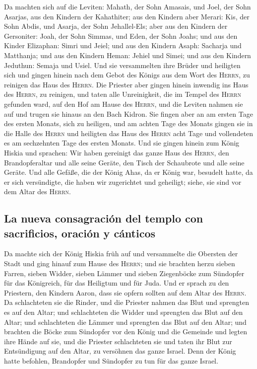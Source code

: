  Da machten sich auf die Leviten: Mahath, der Sohn
Amasais, und Joel, der Sohn Asarjas, aus den Kindern der Kahathiter; aus
den Kindern aber Merari: Kis, der Sohn Abdis, und Asarja, der Sohn
Jehallel-Els; aber aus den Kindern der Gersoniter: Joah, der Sohn
Simmas, und Eden, der Sohn Joahs;  und aus den Kinder
Elizaphan: Simri und Jeiel; und aus den Kindern Asaph: Sacharja und
Matthanja;  und aus den Kindern Heman: Jehiel und Simei;
und aus den Kindern Jeduthun: Semaja und Usiel.  Und sie
versammelten ihre Brüder und heiligten sich und gingen hinein nach dem
Gebot des Königs aus dem Wort des \textsc{Herrn}, zu reinigen das Haus
des \textsc{Herrn}.  Die Priester aber gingen hinein
inwendig ins Haus des \textsc{Herrn}, zu reinigen, und taten alle
Unreinigkeit, die im Tempel des \textsc{Herrn} gefunden ward, auf den
Hof am Hause des \textsc{Herrn}, und die Leviten nahmen sie auf und
trugen sie hinaus an den Bach Kidron.  Sie fingen aber an
am ersten Tage des ersten Monats, sich zu heiligen, und am achten Tage
des Monats gingen sie in die Halle des \textsc{Herrn} und heiligten das
Haus des \textsc{Herrn} acht Tage und vollendeten es am sechzehnten Tage
des ersten Monats.  Und sie gingen hinein zum König
Hiskia und sprachen: Wir haben gereinigt das ganze Haus des
\textsc{Herrn}, den Brandopferaltar und alle seine Geräte, den Tisch der
Schaubrote und alle seine Geräte.  Und alle Gefäße, die
der König Ahas, da er König war, besudelt hatte, da er sich versündigte,
die haben wir zugerichtet und geheiligt; siehe, sie sind vor dem Altar
des \textsc{Herrn}.

\hypertarget{la-nueva-consagraciuxf3n-del-templo-con-sacrificios-oraciuxf3n-y-cuxe1nticos}{%
\subsection{La nueva consagración del templo con sacrificios, oración y
cánticos}\label{la-nueva-consagraciuxf3n-del-templo-con-sacrificios-oraciuxf3n-y-cuxe1nticos}}

 Da machte sich der König Hiskia früh auf und versammelte
die Obersten der Stadt und ging hinauf zum Hause des \textsc{Herrn};
 und sie brachten herzu sieben Farren, sieben Widder,
sieben Lämmer und sieben Ziegenböcke zum Sündopfer für das Königreich,
für das Heiligtum und für Juda. Und er sprach zu den Priestern, den
Kindern Aaron, dass sie opfern sollten auf dem Altar des \textsc{Herrn}.
 Da schlachteten sie die Rinder, und die Priester nahmen
das Blut und sprengten es auf den Altar; und schlachteten die Widder und
sprengten das Blut auf den Altar; und schlachteten die Lämmer und
sprengten das Blut auf den Altar;  und brachten die Böcke
zum Sündopfer vor den König und die Gemeinde und legten ihre Hände auf
sie,  und die Priester schlachteten sie und taten ihr
Blut zur Entsündigung auf den Altar, zu versöhnen das ganze Israel. Denn
der König hatte befohlen, Brandopfer und Sündopfer zu tun für das ganze
Israel.

